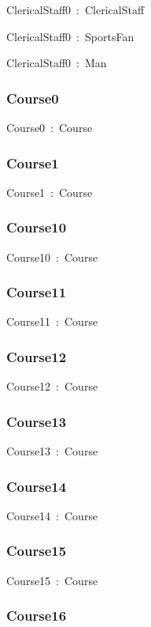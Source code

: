 \documentclass{article}
\begin{document}
ClericalStaff0~:~ClericalStaff

ClericalStaff0~:~SportsFan

ClericalStaff0~:~Man

\subsubsection*{Course0}

Course0~:~Course

\subsubsection*{Course1}

Course1~:~Course

\subsubsection*{Course10}

Course10~:~Course

\subsubsection*{Course11}

Course11~:~Course

\subsubsection*{Course12}

Course12~:~Course

\subsubsection*{Course13}

Course13~:~Course

\subsubsection*{Course14}

Course14~:~Course

\subsubsection*{Course15}

Course15~:~Course

\subsubsection*{Course16}
\end{document}
